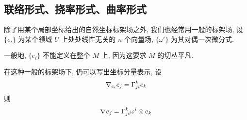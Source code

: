 \subsection{联络形式、挠率形式、曲率形式}
    除了用某个局部坐标给出的自然坐标标架场之外, 我们也经常用一般的标架场, 设 $\{e_i\}$ 为某个领域 $U$ 上处处线性无关的 $n$ 个向量场, $\{\omega^i\}$ 为其对偶一次微分式.
    \begin{remark}
        一般地, $\{e_i\}$ 不能定义在整个 $M$ 上, 因为这要求 $M$ 的切丛平凡.
    \end{remark}
    在这种一般的标架场下, 仍可以写出坐标分量表示, 设
    \begin{equation*}
        \nabla_{e_i}{e_j} = \Gamma_{ji}^{k}e_k
    \end{equation*}
    则
    \begin{equation*}
        \nabla_{}{e_j} = \Gamma_{ji}^{k}\omega^i\otimes e_k
    \end{equation*}
